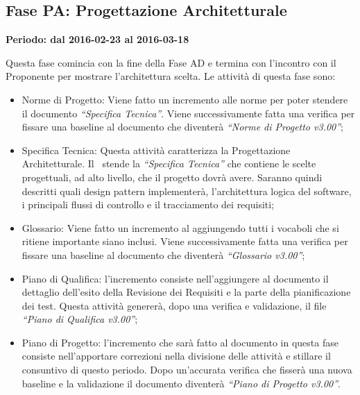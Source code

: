 \documentclass[../PianoProgetto.tex]{subfiles}
\begin{document}
	\subsection{Fase PA: Progettazione Architetturale}
		\textbf{Periodo: dal 2016-02-23 al 2016-03-18}
		
		Questa fase comincia con la fine della Fase AD e termina con l’incontro con il Proponente per mostrare l’architettura scelta. Le attività di questa fase sono:
		\begin{itemize}
			\item Norme di Progetto: Viene fatto un incremento alle norme per poter stendere il documento \textit{“Specifica Tecnica”}. Viene successivamente fatta una verifica per fissare una baseline al documento che diventerà \textit{“Norme di Progetto v3.00”};

			\item Specifica Tecnica: Questa attività caratterizza la Progettazione Architetturale. Il \progettista\ stende la \textit{“Specifica Tecnica”} che contiene le scelte progettuali, ad alto livello, che il progetto dovrà avere. Saranno quindi descritti quali design pattern implementerà, l’architettura logica del software, i principali flussi di controllo e il tracciamento dei requisiti;

			\item Glossario: Viene fatto un incremento al \glossario aggiungendo tutti i vocaboli che si ritiene importante siano inclusi. Viene successivamente fatta una verifica per fissare una baseline al documento che diventerà \textit{“Glossario v3.00”};

 			\item Piano di Qualifica: l’incremento consiste nell’aggiungere al documento \pianodiqualifica il dettaglio dell’esito della Revisione dei Requisiti e la parte della pianificazione dei test. Questa attività genererà, dopo una verifica e validazione, il file \textit{“Piano di Qualifica v3.00”};

			\item Piano di Progetto: l’incremento che sarà fatto al documento \pianodiprogetto in questa fase consiste nell’apportare correzioni nella divisione delle attività e stillare il consuntivo di questo periodo. Dopo un’accurata verifica che fisserà una nuova baseline e la validazione il documento diventerà \textit{“Piano di Progetto v3.00”}.
		\end{itemize}
		
\end{document}
